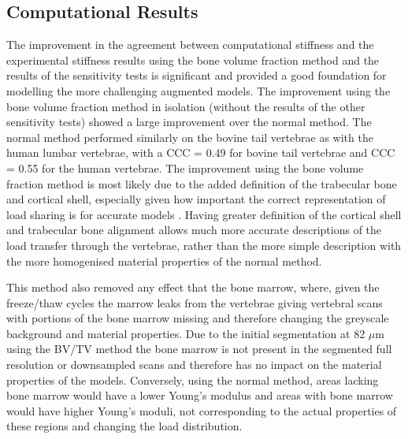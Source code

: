 \subsection{Computational Results}

The improvement in the agreement between computational stiffness and the experimental stiffness results using the bone volume fraction method and the results of the sensitivity tests is significant and provided a good foundation for modelling the more challenging augmented models.
The improvement using the bone volume fraction method in isolation (without the results of the other sensitivity tests) showed a large improvement over the normal method.
The normal method performed similarly on the bovine tail vertebrae as with the human lumbar vertebrae, with a CCC = 0.49 for bovine tail vertebrae and CCC = 0.55 for the human vertebrae.
The improvement using the bone volume fraction method is most likely due to the added definition of the trabecular bone and cortical shell, especially given how important the correct representation of load sharing is for accurate models \cite{eswaran2006cortical}.
Having greater definition of the cortical shell and trabecular bone alignment allows much more accurate descriptions of the load transfer through the vertebrae, rather than the more simple description with the more homogenised material properties of the normal method.

This method also removed any effect that the bone marrow, where, given the freeze/thaw cycles the marrow leaks from the vertebrae giving vertebral scans with portions of the bone marrow missing and therefore changing the greyscale background and material properties.
Due to the initial segmentation at 82 $\mu$m using the BV/TV method the bone marrow is not present in the segmented full resolution or downsampled scans and therefore has no impact on the material properties of the models.
Conversely, using the normal method, areas lacking bone marrow would have a lower Young's modulus and areas with bone marrow would have higher Young's moduli, not corresponding to the actual properties of these regions and changing the load distribution.

